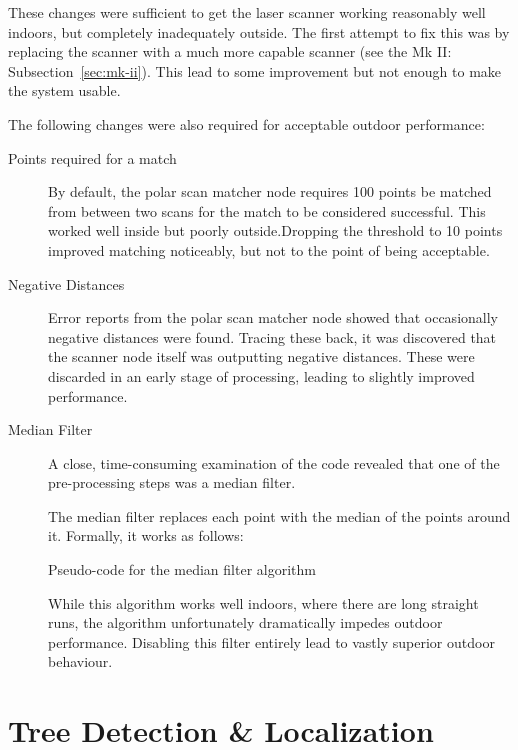\documentclass[12pt,oneside,a4paper]{book}
\begin{document}
These changes were sufficient to get the laser scanner working
reasonably well indoors, but completely inadequately outside. The
first attempt to fix this was by replacing the scanner with a much
more capable scanner (see the Mk II: Subsection~\ref{sec:mk-ii}). This
lead to some improvement but not enough to make the system usable.

The following changes were also required for acceptable outdoor
performance:

\begin{description}
\item[Points required for a match] By default, the polar scan matcher
  node requires 100 points be matched from between two scans for the
  match to be considered successful. This worked well inside but
  poorly outside.Dropping the threshold to 10
  points improved matching noticeably, but not to the point of being
  acceptable.
\item[Negative Distances] Error reports from the polar scan matcher node
  showed that occasionally negative distances were found. Tracing
  these back, it was discovered that the scanner node itself was
  outputting negative distances. These were discarded in an early
  stage of processing, leading to slightly improved performance.
\item[Median Filter] A close, time-consuming examination of the code
  revealed that one of the pre-processing steps was a median filter.

  The median filter replaces each point with the median of the points
  around it. Formally, it works as follows:
  \IncMargin{1em}
  \begin{algorithm}
    \BlankLine
    \caption{Pseudo-code for the median filter algorithm}
  \end{algorithm}

  While this algorithm works well indoors, where there are long
  straight runs, the algorithm unfortunately dramatically
  impedes outdoor performance. Disabling this filter entirely lead to
  vastly superior outdoor behaviour.
\end{description}


\section{Tree Detection \& Localization}
\label{sec:tree-detection-localization}
\end{document}
